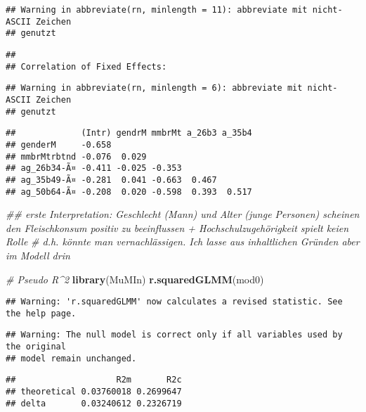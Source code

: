 \documentclass[
]{article}
\newenvironment{Shaded}{\begin{snugshade}}{\end{snugshade}}
\newcommand{\CommentTok}[1]{\textcolor[rgb]{0.56,0.35,0.01}{\textit{#1}}}
\newcommand{\KeywordTok}[1]{\textcolor[rgb]{0.13,0.29,0.53}{\textbf{#1}}}
\newcommand{\NormalTok}[1]{#1}
\begin{document}
\begin{verbatim}
## Warning in abbreviate(rn, minlength = 11): abbreviate mit nicht-ASCII Zeichen
## genutzt
\end{verbatim}

\begin{verbatim}
## 
## Correlation of Fixed Effects:
\end{verbatim}

\begin{verbatim}
## Warning in abbreviate(rn, minlength = 6): abbreviate mit nicht-ASCII Zeichen
## genutzt
\end{verbatim}

\begin{verbatim}
##             (Intr) gendrM mmbrMt a_26b3 a_35b4
## genderM     -0.658                            
## mmbrMtrbtnd -0.076  0.029                     
## ag_26b34-Ã¤ -0.411 -0.025 -0.353              
## ag_35b49-Ã¤ -0.281  0.041 -0.663  0.467       
## ag_50b64-Ã¤ -0.208  0.020 -0.598  0.393  0.517
\end{verbatim}

\begin{Shaded}
\begin{Highlighting}[]
\CommentTok{## erste Interpretation: Geschlecht (Mann) und Alter (junge Personen) scheinen den Fleischkonsum positiv zu beeinflussen + Hochschulzugehörigkeit spielt keien Rolle}
\CommentTok{# d.h. könnte man vernachlässigen. Ich lasse aus inhaltlichen Gründen aber im Modell drin}

\CommentTok{# Pseudo R^2}
\KeywordTok{library}\NormalTok{(MuMIn)}
\KeywordTok{r.squaredGLMM}\NormalTok{(mod0) }
\end{Highlighting}
\end{Shaded}

\begin{verbatim}
## Warning: 'r.squaredGLMM' now calculates a revised statistic. See the help page.
\end{verbatim}

\begin{verbatim}
## Warning: The null model is correct only if all variables used by the original
## model remain unchanged.
\end{verbatim}

\begin{verbatim}
##                    R2m       R2c
## theoretical 0.03760018 0.2699647
## delta       0.03240612 0.2326719
\end{verbatim}
\end{document}
